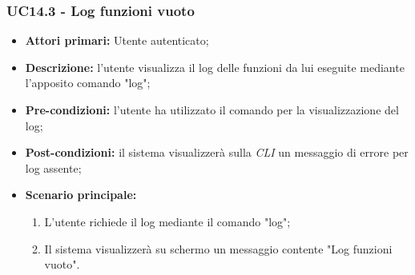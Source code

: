 \subsubsection{UC14.3 - Log funzioni vuoto}
\begin{itemize}
	\item \textbf{Attori primari:} Utente autenticato;
	\item \textbf{Descrizione:} l'utente visualizza il log delle funzioni da lui eseguite mediante l'apposito comando "log"; 
	\item \textbf{Pre-condizioni:} l'utente ha utilizzato il comando per la visualizzazione del log;
	\item \textbf{Post-condizioni:} il sistema visualizzerà sulla \textit{CLI\glo} un messaggio di errore per log assente;
	\item \textbf{Scenario principale:} 
	\begin{enumerate}
		\item L'utente richiede il log mediante il comando "log";
		\item Il sistema visualizzerà su schermo un messaggio contente "Log funzioni vuoto".
	\end{enumerate}
\end{itemize}